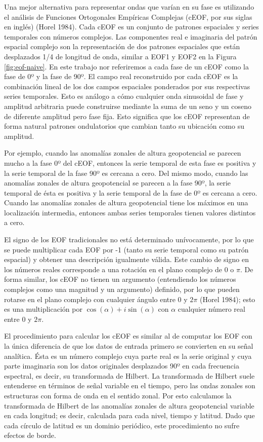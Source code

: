 \documentclass[12pt,oneside,a4paper]{reedthesis}
\begin{document}
Una mejor alternativa para representar ondas que varían en su fase es utilizando el análisis de Funciones Ortogonales Empíricas Complejas (cEOF, por sus siglas en inglés) (Horel 1984).
Cada cEOF es un conjunto de patrones espaciales y series temporales con números complejos.
Las componentes real e imaginaria del patrón espacial complejo son la representación de dos patrones espaciales que están desplazados 1/4 de longitud de onda, similar a EOF1 y EOF2 en la Figura \ref{fig:eof-naive}.
En este trabajo nor referiremos a cada fase de un cEOF como la fase de 0º y la fase de 90º.
El campo real reconstruido por cada cEOF es la combinación lineal de los dos campos espaciales ponderados por sus respectivas series temporales.
Esto es análogo a cómo cualquier onda sinusoidal de fase y amplitud arbitraria puede construirse mediante la suma de un seno y un coseno de diferente amplitud pero fase fija.
Esto significa que los cEOF representan de forma natural patrones ondulatorios que cambian tanto su ubicación como su amplitud.

Por ejemplo, cuando las anomalías zonales de altura geopotencial se parecen mucho a la fase 0º del cEOF, entonces la serie temporal de esta fase es positiva y la serie temporal de la fase 90º es cercana a cero.
Del mismo modo, cuando las anomalías zonales de altura geopotencial se parecen a la fase 90º, la serie temporal de ésta es positiva y la serie temporal de la fase de 0º es cercana a cero.
Cuando las anomalías zonales de altura geopotencial tiene los máximos en una localización intermedia, entonces ambas series temporales tienen valores distintos a cero.

El signo de los EOF tradicionales no está determinado unívocamente, por lo que se puede multiplicar cada EOF por -1 (tanto su serie temporal como su patrón espacial) y obtener una descripción igualmente válida.
Este cambio de signo en los números reales corresponde a una rotación en el plano complejo de 0 o \(\pi\).
De forma similar, los cEOF no tienen un argumento (entendiendo los números complejos como una magnitud y un argumento) definido, por lo que pueden rotarse en el plano complejo con cualquier ángulo entre 0 y \(2\pi\) (Horel 1984); esto es una multiplicación por \(\cos(\alpha) + i\sin(\alpha)\) con \(\alpha\) cualquier número real entre 0 y \(2\pi\).

El procedimiento para calcular los cEOF es similar al de computar los EOF con la única diferencia de que los datos de entrada primero se convierten en su señal analítica.
Ésta es un número complejo cuya parte real es la serie original y cuya parte imaginaria son los datos originales desplazados 90º en cada frecuencia espectral, es decir, su transformada de Hilbert.
La transformada de Hilbert suele entenderse en términos de señal variable en el tiempo, pero las ondas zonales son estructuras con forma de onda en el sentido zonal.
Por esto calculamos la transformada de Hilbert de las anomalías zonales de altura geopotencial variable en cada longitud; es decir, calculada para cada nivel, tiempo y latitud.
Dado que cada círculo de latitud es un dominio periódico, este procedimiento no sufre efectos de borde.
\end{document}
